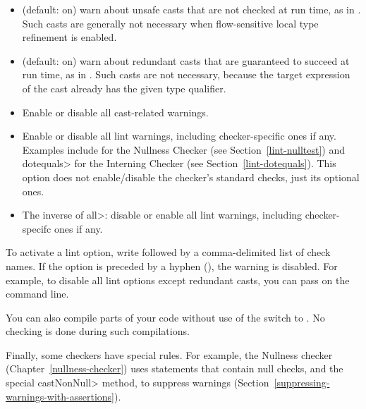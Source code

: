 \begin{itemize}

\item
   (default: on) warn about unsafe casts that are not
  checked at run time, as in .  Such casts
  are generally not necessary when flow-sensitive local type refinement is
  enabled.

\item
   (default: on) warn about redundant
  casts that are guaranteed to succeed at run time,
  as in .  Such casts are not necessary,
  because the target expression of the cast already has the given type
  qualifier.

\item
   Enable or disable all cast-related warnings.

\item
   Enable or disable all lint warnings, including
  checker-specific ones if any.  Examples include  for the
  Nullness Checker (see Section~\ref{lint-nulltest}) and \<dotequals> for
  the Interning Checker (see Section~\ref{lint-dotequals}).  This option
  does not enable/disable the checker's standard checks, just its optional
  ones.

\item
   The inverse of \<all>:  disable or enable all lint warnings,
  including checker-specifc ones if any.

\end{itemize}


\noindent
To activate a lint option, write  followed by a
comma-delimited list of check names.  If the option is preceded by a
hyphen (\code{-}), the warning is disabled.  For example, to disable all
lint options except redundant casts, you can pass
 on the command line.


You can also compile parts of your code without use of the
 switch to .  No checking is done during
such compilations.

Finally, some checkers have special rules.  For example, the Nullness
checker (Chapter~\ref{nullness-checker}) uses  statements that contain
null checks, and the special \<castNonNull> method, to suppress warnings
(Section~\ref{suppressing-warnings-with-assertions}).



